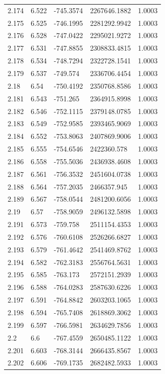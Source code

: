 \begin{tabular}{lllll}
2.174 & 6.522 & -745.3574 & 2267646.1882 & 1.0003 \\
2.175 & 6.525 & -746.1995 & 2281292.9942 & 1.0003 \\
2.176 & 6.528 & -747.0422 & 2295021.9272 & 1.0003 \\
2.177 & 6.531 & -747.8855 & 2308833.4815 & 1.0003 \\
2.178 & 6.534 & -748.7294 & 2322728.1541 & 1.0003 \\
2.179 & 6.537 & -749.574 & 2336706.4454 & 1.0003 \\
2.18 & 6.54 & -750.4192 & 2350768.8586 & 1.0003 \\
2.181 & 6.543 & -751.265 & 2364915.8998 & 1.0003 \\
2.182 & 6.546 & -752.1115 & 2379148.0785 & 1.0003 \\
2.183 & 6.549 & -752.9585 & 2393465.9069 & 1.0003 \\
2.184 & 6.552 & -753.8063 & 2407869.9006 & 1.0003 \\
2.185 & 6.555 & -754.6546 & 2422360.578 & 1.0003 \\
2.186 & 6.558 & -755.5036 & 2436938.4608 & 1.0003 \\
2.187 & 6.561 & -756.3532 & 2451604.0738 & 1.0003 \\
2.188 & 6.564 & -757.2035 & 2466357.945 & 1.0003 \\
2.189 & 6.567 & -758.0544 & 2481200.6056 & 1.0003 \\
2.19 & 6.57 & -758.9059 & 2496132.5898 & 1.0003 \\
2.191 & 6.573 & -759.758 & 2511154.4353 & 1.0003 \\
2.192 & 6.576 & -760.6108 & 2526266.6827 & 1.0003 \\
2.193 & 6.579 & -761.4642 & 2541469.8762 & 1.0003 \\
2.194 & 6.582 & -762.3183 & 2556764.5631 & 1.0003 \\
2.195 & 6.585 & -763.173 & 2572151.2939 & 1.0003 \\
2.196 & 6.588 & -764.0283 & 2587630.6226 & 1.0003 \\
2.197 & 6.591 & -764.8842 & 2603203.1065 & 1.0003 \\
2.198 & 6.594 & -765.7408 & 2618869.3062 & 1.0003 \\
2.199 & 6.597 & -766.5981 & 2634629.7856 & 1.0003 \\
2.2 & 6.6 & -767.4559 & 2650485.1122 & 1.0003 \\
2.201 & 6.603 & -768.3144 & 2666435.8567 & 1.0003 \\
2.202 & 6.606 & -769.1735 & 2682482.5933 & 1.0003 \\

\end{tabular}
